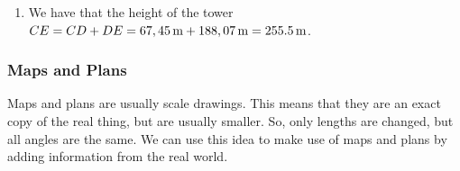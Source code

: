 {\begin{mdframed}[linewidth=4, leftmargin=40, rightmargin=40]
\begin{exercise}
\begin{enumerate}[noitemsep, label=\textbf{Step} \textbf{\arabic*}. ]
{\begin{minipage}{\columnwidth}
    \parbox[t]{48pt}{\raggedleft 
    (14.27)}
    \end{minipage}\vspace{12pt}\par
    }%
    
        
        \item  
        \label{m39411*id82527}We have that the height of the tower
\begin{math}CE=CD+DE=67,45\phantom{\rule{0.166667em}{0ex}}\mathrm{m}+188,07\phantom{\rule{0.166667em}{0ex}}\mathrm{m}=255.5\phantom{\rule{0.166667em}{0ex}}\mathrm{m}\end{math}.
 \par 
        \end{enumerate}
         

    \end{exercise}
    \end{mdframed}
    }
    \noindent
  
      
      \label{m39411*uid27}
            \subsubsection{ Maps and Plans}
            \nopagebreak
            
        
        \label{m39411*id82626}Maps and plans are usually scale drawings. This means that they are an exact copy of the real thing, but are usually smaller. So, only lengths are changed, but all angles are the same. We can use this idea to make use of maps and plans by adding information from the real world.\par 
\label{m39411*secfhsst!!!underscore!!!id1596}\vspace{.5cm} 
      

